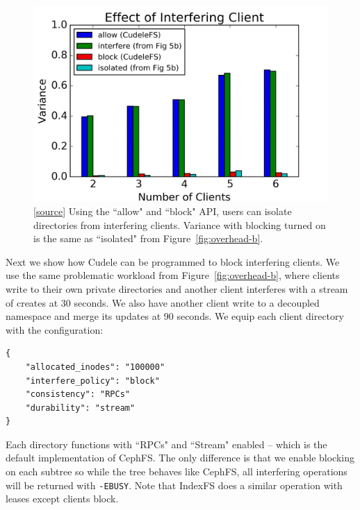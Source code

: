 \begin{figure}[tb]
\centering
\includegraphics[width=1.0\linewidth]{graphs/slowdown-allow-block.png}
\caption{
[\href{https://...}{source}]
Using the ``allow" and ``block" API, users can isolate directories from
interfering clients. Variance with blocking turned on is the same as
``isolated" from Figure~\ref{fig:overhead-b}.
\label{fig:slowdown-allow-block}}
\end{figure}

Next we show how Cudele can be programmed to block interfering clients. We
use the same problematic workload from Figure~\ref{fig:overhead-b}, where
clients write to their own private directories and another client interferes with a stream of creates at
30 seconds.  We also have another client write to a decoupled namespace and
merge its updates at 90 seconds.  We equip each client directory with the
configuration:

\begin{listing}[tb]
\begin{verbatim}
{     
    "allocated_inodes": "100000"
    "interfere_policy": "block"
    "consistency": "RPCs"
    "durability": "stream"
}
\end{verbatim}
\end{listing}

Each directory functions with ``RPCs"
and ``Stream" enabled -- which is the default implementation of CephFS. The only
difference is that we enable blocking on each subtree so while the tree behaves
like CephFS, all interfering operations will be returned with \texttt{-EBUSY}.
Note that IndexFS does a similar operation with leases except clients block.

